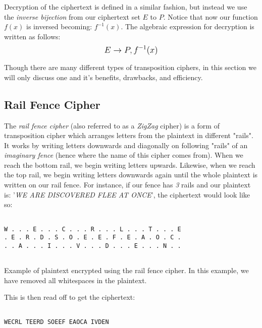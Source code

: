 Decryption of the ciphertext is defined in a similar fashion, but instead we use the \textit{inverse bijection} from our ciphertext set $E$ to $P$. 
Notice that now our function $f(x)$ is inversed becoming: $f^{-1}(x)$. The algebraic expression for decryption is written as follows: 
$$\mathlarger{E \rightarrow P, f^{-1}(x)}$$

Though there are many different types of transposition ciphers, in this section we will only discuss one and it's benefits, drawbacks, and efficiency.

\subsection{Rail Fence Cipher}

The \textit{rail fence cipher} (also referred to as a \textit{ZigZag} cipher) is a form of transposition cipher which arranges letters from
the plaintext in different "rails". It works by writing letters downwards and diagonally on following "rails" of an 
\textit{imaginary fence} (hence where the name of this cipher comes from). When we reach the bottom rail, we begin writing 
letters upwards. Likewise, when we reach the top rail, we begin writing letters downwards again until the whole plaintext is
written on our rail fence. For instance, if our fence has \textit{3} rails and our plaintext is:
'\textit{WE ARE DISCOVERED FLEE AT ONCE}', the ciphertext would look like so:

\begin{listing}[H]
    \begin{verbatim}
    
W . . . E . . . C . . . R . . . L . . . T . . . E
. E . R . D . S . O . E . E . F . E . A . O . C .
. . A . . . I . . . V . . . D . . . E . . . N . .
    
    \end{verbatim}
    \caption{Example of plaintext encrypted using the rail fence cipher. In this example, we have removed
    all whitespaces in the plaintext.}
\end{listing}

This is then read off to get the ciphertext:

\begin{verbatim}
    
WECRL TEERD SOEEF EAOCA IVDEN
\end{verbatim}

